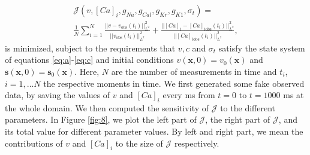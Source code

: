 \documentclass[12pt,a4paper]{article}
\begin{document}
\begin{eqnarray} \nonumber
\mathcal{J}(v, [Ca]_i, g_{Na}, g_{Cal}, g_{Kr}, g_{K1}, \sigma_t)= \\
\frac{1}{N} \sum_{i=1}^{N} \frac{||v-v_{\text{obs}}(t_i)||^2_{L^2}}{||v_{\text{obs}}(t_i)||^2_{L^2}} + \frac{||[Ca]_i-[Ca]_{i\text{obs}}(t_i) ||^2_{L^2}}{||[Ca]_{i\text{obs}}(t_i) ||^2_{L^2}},\label{J}
\end{eqnarray}
is minimized, subject to the requirements that $v, c$ and $\sigma_t$ satisfy the state system of equations \eqref{eq:a}-\eqref{eq:c} and initial conditions $v(\textbf{x},0)=v_0(\textbf{x})$ and $\mathbf{s}(\mathbf{x},0)=\mathbf{s}_0(\mathbf{x})$. Here, $N$ are the number of measurements in time and $t_i$, $i=1, \dots N$ the respective moments in time. We first generated some fake observed data, by saving the values of $v$ and $[Ca]_i$ every ms from $t=0$ to $t=1000$ ms at the whole domain. We then computed the sensitivity of $\mathcal{J}$ to the different parameters. In Figure \ref{fig:8}, we plot the left part of $\mathcal{J}$, the right part of $\mathcal{J}$, and its total value for different parameter values. By left and right part, we mean the contributions of $v$ and $[Ca]_i$ to the size of $\mathcal{J}$ respectively. 
\end{document}
